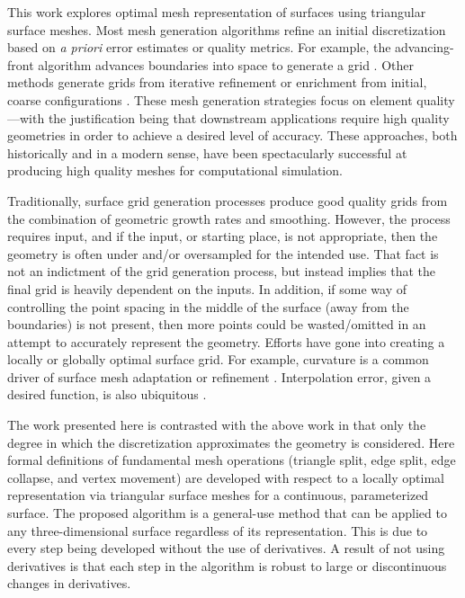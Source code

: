 This work explores optimal mesh representation of surfaces using 
triangular surface meshes.
Most mesh generation algorithms refine an initial discretization based
on {\it a priori} error estimates or quality metrics. For example, the
advancing-front algorithm advances boundaries into space to generate a
grid \cite{tristrano98,diaz-morcillo98}. Other methods generate
grids from iterative refinement or enrichment from initial, coarse
configurations \cite{marcum98,marcum00,shewchuk02}. These mesh
generation strategies focus on element quality---with the
justification being that downstream applications require high quality
geometries in order to achieve a desired level of accuracy. These
approaches, both historically and in a modern sense, have been 
spectacularly successful at producing high quality meshes for 
computational simulation.

Traditionally, surface grid generation processes produce good quality
grids from the combination of geometric growth rates and smoothing.
However, the process requires input, and if the input, or starting place,
is not appropriate, then the geometry is often under and/or oversampled
for the intended use. That fact is not an indictment of the grid
generation process, but instead implies that the final grid is heavily
dependent on the inputs. In addition, if some way of controlling the
point spacing in the middle of the surface (away from the boundaries) is
not present, then more points could be wasted/omitted in an attempt to
accurately represent the geometry. Efforts have gone into
creating a locally or globally optimal surface grid. For example,
curvature is a common driver of surface mesh adaptation or refinement
\cite{siqueria13}. Interpolation error, given a desired function, 
is also ubiquitous \cite{peraire87,alauzet06,buscaglia97,huang05}.

The work presented here is contrasted with the above work in that only
the degree in which the discretization approximates the geometry is
considered.  Here formal definitions of fundamental mesh operations
(triangle split, edge split, edge collapse, and vertex movement) are
developed with respect to a locally optimal representation via 
triangular surface meshes for a continuous, parameterized surface. The 
proposed algorithm is a general-use method
that can be applied to any three-dimensional surface regardless of its 
representation.
This is due to every step being developed without the use of
derivatives. A result of not using derivatives is that each step in the
algorithm is robust to large or discontinuous changes in derivatives.

